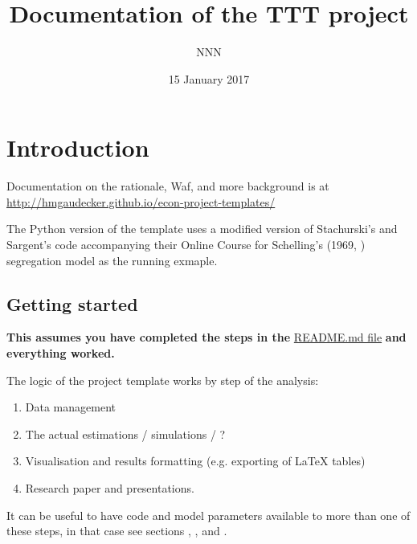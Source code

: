 \documentclass[a4paper,11pt,english]{sphinxmanual}
\title{Documentation of the TTT project}
\date{15 January 2017}
\author{NNN}
\begin{document}
\maketitle
\tableofcontents
{}\label{index::doc}



\chapter{Introduction}
\label{introduction:welcome-to-the-ttt-project-s-documentation}\label{introduction:introduction}\label{introduction::doc}\label{introduction:id1}
Documentation on the rationale, Waf, and more background is at \url{http://hmgaudecker.github.io/econ-project-templates/}

The Python version of the template uses a modified version of Stachurski's and Sargent's code accompanying their Online Course \label{introduction:id2}{\hyperref[references:stachurskisargent13]{\sphinxcrossref{{[}2{]}}}} for Schelling's (1969, \label{introduction:id3}{\hyperref[references:schelling69]{\sphinxcrossref{{[}1{]}}}}) segregation model as the running exmaple.


\section{Getting started}
\label{introduction:getting-started}\label{introduction:id4}
\textbf{This assumes you have completed the steps in the} \href{https://github.com/hmgaudecker/econ-project-templates/tree/python\#templates-for-reproducible-research-projects-in-economics}{README.md file} \textbf{and everything worked.}

The logic of the project template works by step of the analysis:
\begin{enumerate}
\item {} 
Data management

\item {} 
The actual estimations / simulations / ?

\item {} 
Visualisation and results formatting (e.g. exporting of LaTeX tables)

\item {} 
Research paper and presentations.

\end{enumerate}

It can be useful to have code and model parameters available to more than one of these steps, in that case see sections {\hyperref[model_specs:model\string-specifications]{}}, {\hyperref[model_code:model\string-code]{}}, and {\hyperref[library:library]{}}.
\end{document}
